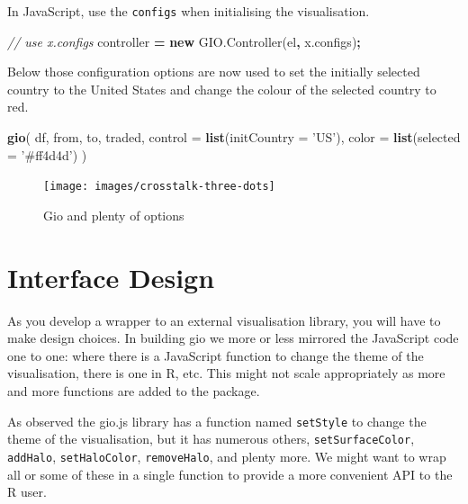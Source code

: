 \documentclass[10pt,]{krantz}
\makeatletter
\newenvironment{Shaded}{\begin{snugshade}}{\end{snugshade}}
\newcommand{\AttributeTok}[1]{\textcolor[rgb]{0.61,0.61,0.61}{#1}}
\newcommand{\CommentTok}[1]{\textcolor[rgb]{0.37,0.37,0.37}{\textit{#1}}}
\newcommand{\DataTypeTok}[1]{\textcolor[rgb]{0.27,0.27,0.27}{#1}}
\newcommand{\KeywordTok}[1]{\textcolor[rgb]{0.27,0.27,0.27}{\textbf{#1}}}
\newcommand{\NormalTok}[1]{#1}
\newcommand{\OperatorTok}[1]{\textcolor[rgb]{0.43,0.43,0.43}{\textbf{#1}}}
\newcommand{\StringTok}[1]{\textcolor[rgb]{0.5,0.5,0.5}{#1}}
\newcommand{\VariableTok}[1]{\textcolor[rgb]{0,0,0}{#1}}
\newenvironment{kframe}{%
\medskip{}
\setlength{\fboxsep}{.8em}
 \def\at@end@of@kframe{}%
 \ifinner\ifhmode%
  \def\at@end@of@kframe{\end{minipage}}%
  \begin{minipage}{\columnwidth}%
 \fi\fi%
 \def\FrameCommand##1{\hskip\@totalleftmargin \hskip-\fboxsep
 \colorbox{shadecolor}{##1}\hskip-\fboxsep
     \hskip-\linewidth \hskip-\@totalleftmargin \hskip\columnwidth}%
 \MakeFramed {\advance\hsize-\width
   \@totalleftmargin\z@ \linewidth\hsize
   \@setminipage}}%
 {\par\unskip\endMakeFramed%
 \at@end@of@kframe}
\renewenvironment{Shaded}{\begin{kframe}}{\end{kframe}}
\makeatother
\begin{document}
In JavaScript, use the \texttt{configs} when initialising the visualisation.

\begin{Shaded}
\begin{Highlighting}[]
\CommentTok{// use x.configs}
\NormalTok{controller }\OperatorTok{=} \KeywordTok{new} \VariableTok{GIO}\NormalTok{.}\AttributeTok{Controller}\NormalTok{(el}\OperatorTok{,} \VariableTok{x}\NormalTok{.}\AttributeTok{configs}\NormalTok{)}\OperatorTok{;}
\end{Highlighting}
\end{Shaded}

Below those configuration options are now used to set the initially selected country to the United States and change the colour of the selected country to red.

\begin{Shaded}
\begin{Highlighting}[]
\KeywordTok{gio}\NormalTok{(}
\NormalTok{  df, from, to, traded, }
  \DataTypeTok{control =} \KeywordTok{list}\NormalTok{(}\DataTypeTok{initCountry =} \StringTok{'US'}\NormalTok{), }
  \DataTypeTok{color =} \KeywordTok{list}\NormalTok{(}\DataTypeTok{selected =} \StringTok{'#ff4d4d'}\NormalTok{)}
\NormalTok{) }
\end{Highlighting}
\end{Shaded}

\begin{figure}[H]

{\centering \texttt{[image: images/crosstalk-three-dots]} 

}

\caption{Gio and plenty of options}\label{fig:crosstalk-three-dots}
\end{figure}

\hypertarget{widgets-final-interface}{%
\section{Interface Design}\label{widgets-final-interface}}

As you develop a wrapper to an external visualisation library, you will have to make design choices. In building gio we more or less mirrored the JavaScript code one to one: where there is a JavaScript function to change the theme of the visualisation, there is one in R, etc. This might not scale appropriately as more and more functions are added to the package.

As observed the gio.js library has a function named \texttt{setStyle} to change the theme of the visualisation, but it has numerous others, \texttt{setSurfaceColor}, \texttt{addHalo}, \texttt{setHaloColor}, \texttt{removeHalo}, and plenty more. We might want to wrap all or some of these in a single function to provide a more convenient API to the R user.
\end{document}
